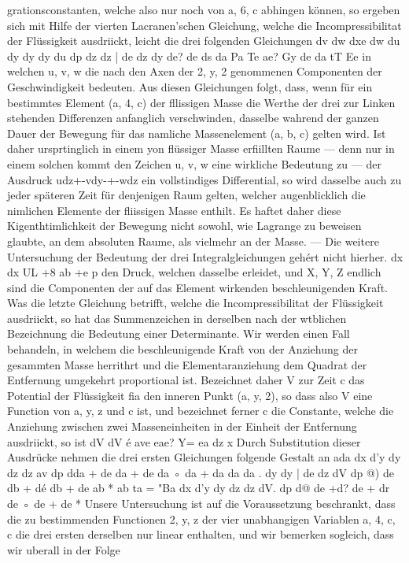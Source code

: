 \documentclass[11pt]{article}
\begin{document}
grationsconstanten, welche also nur noch von a, 6, c abhingen können, so ergeben sich mit
Hilfe der vierten Lacranen’schen Gleichung, welche die Incompressibilitat der Flüssigkeit
ausdriickt, leicht die drei folgenden Gleichungen dv dw dxe dw du dy dy dy du dp dz
dz | de dz dy de? de ds da Pa Te ae? Gy de da tT Ee in welchen u, v, w die nach den
Axen der 2, y, 2 genommenen Componenten der Geschwindigkeit bedeuten. Aus diesen
Gleichungen folgt, dass, wenn für ein bestimmtes Element (a, 4, c) der fllissigen Masse
die Werthe der drei zur Linken stehenden Differenzen anfanglich verschwinden, dasselbe
wahrend der ganzen Dauer der Bewegung für das namliche Massenelement (a, b, c) gelten wird. Ist daher ursprtinglich in einem yon flüssiger Masse erfiillten Raume — denn
nur in einem solchen kommt den Zeichen u, v, w eine wirkliche Bedeutung zu — der
Ausdruck udz+-vdy-+-wdz ein vollstindiges Differential, so wird dasselbe auch zu jeder
späteren Zeit für denjenigen Raum gelten, welcher augenblicklich die nimlichen Elemente
der fliissigen Masse enthilt. Es haftet daher diese Kigenthtimlichkeit der Bewegung nicht
sowohl, wie Lagrange zu beweisen glaubte, an dem absoluten Raume, als vielmehr an der
Masse. — Die weitere Untersuchung der Bedeutung der drei Integralgleichungen gehért
nicht hierher. dx dx UL +8 ab +e
p den Druck, welchen dasselbe erleidet, und X, Y, Z endlich sind die Componenten
der auf das Element wirkenden beschleunigenden Kraft. Was die letzte Gleichung betrifft, welche die Incompressibilitat der Flüssigkeit ausdriickt, so hat das Summenzeichen
in derselben nach der wtblichen Bezeichnung die Bedeutung einer Determinante. Wir werden einen Fall behandeln, in welchem die beschleunigende Kraft von der Anziehung der
gesammten Masse herrithrt und die Elementaranziehung dem Quadrat der Entfernung
umgekehrt proportional ist. Bezeichnet daher V zur Zeit c das Potential der Flüssigkeit
fia den inneren Punkt (a, y, 2), so dass also V eine Function von a, y, z und c ist, und bezeichnet ferner c die Constante, welche die Anziehung zwischen zwei Masseneinheiten
in der Einheit der Entfernung ausdriickt, so ist dV dV é ave eae? Y= ea dz x Durch
Substitution dieser Ausdrücke nehmen die drei ersten Gleichungen folgende Gestalt an
ada dx d’y dy dz dz av dp dda + de da + de da ◦ da + da da da . dy dy | de dz dV dp
@) de db + dé db + de ab * ab ta = "Ba dx d’y dy dz dz dV. dp d@ de +d? de + dr de
◦
de + de * Unsere Untersuchung ist auf die Voraussetzung beschrankt, dass die zu bestimmenden Functionen 2, y, z der vier unabhangigen Variablen a, 4, c, c die drei ersten
derselben nur linear enthalten, und wir bemerken sogleich, dass wir uberall in der Folge
\end{document}
